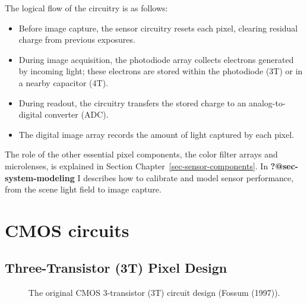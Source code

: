 \documentclass[
  letterpaper,
]{book}
\providecommand{\tightlist}{%
  \setlength{\itemsep}{0pt}\setlength{\parskip}{0pt}}\usepackage{longtable,booktabs,array}
\begin{document}
The logical flow of the circuitry is as follows:

\begin{itemize}
\tightlist
\item
  Before image capture, the sensor circuitry resets each pixel, clearing
  residual charge from previous exposures.
\item
  During image acquisition, the photodiode array collects electrons
  generated by incoming light; these electrons are stored within the
  photodiode (3T) or in a nearby capacitor (4T).
\item
  During readout, the circuitry transfers the stored charge to an
  analog-to-digital converter (ADC).
\item
  The digital image array records the amount of light captured by each
  pixel.
\end{itemize}

The role of the other essential pixel components, the color filter
arrays and microlenses, is explained in Section
Chapter~\ref{sec-sensor-components}. In \textbf{?@sec-system-modeling} I
describes how to calibrate and model sensor performance, from the scene
light field to image capture.

\section{CMOS circuits}\label{sec-sensor-circuits}

\subsection{Three-Transistor (3T) Pixel
Design}\label{sec-3T-pixel-design}

\begin{figure}


\caption{\label{fig-sensor-3T-circuit}The original CMOS 3-transistor
(3T) circuit design (Fossum (1997)).}

\end{figure}%
\end{document}
